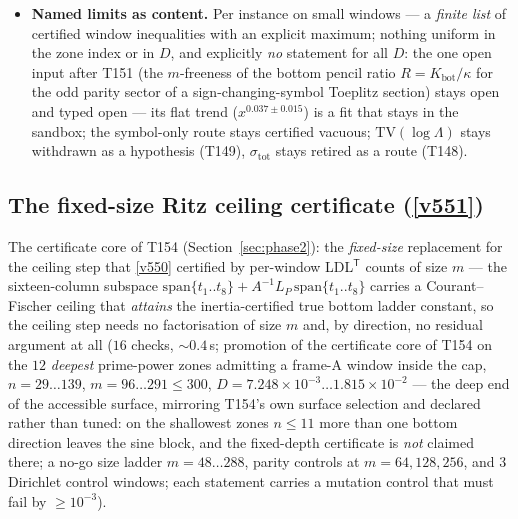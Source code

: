 \documentclass[11pt,a4paper]{article}
\begin{document}
\begin{itemize}[leftmargin=1.5em]
the inflated floor $1.5\kappa$ makes the Cholesky \emph{refuse} on $12/12$.
\item \textbf{Named limits as content.} Per instance on small windows --- a \emph{finite
list} of certified window inequalities with an explicit maximum; nothing uniform in the zone
index or in $D$, and explicitly \emph{no} statement for all $D$: the one open input after
T151 (the $m$-freeness of the bottom pencil ratio $R=K_{\mathrm{bot}}/\kappa$ for the odd
parity sector of a sign-changing-symbol Toeplitz section) stays open and typed open --- its
flat trend ($x^{0.037\pm0.015}$) is a fit that stays in the sandbox; the symbol-only route
stays certified vacuous; $\mathrm{TV}(\log\Lambda)$ stays withdrawn as a hypothesis (T149),
$\sigma_{\mathrm{tot}}$ stays retired as a route (T148).
\end{itemize}

\subsection{The fixed-size Ritz ceiling certificate (\texorpdfstring{\vref{v551}}{v551})}\label{sec:v551}
The certificate core of T154 (Section~\ref{sec:phase2}): the \emph{fixed-size} replacement
for the ceiling step that \vref{v550} certified by per-window LDL$^{\mathsf T}$ counts of
size $m$ --- the sixteen-column subspace
$\mathrm{span}\{t_1..t_8\}+A^{-1}L_P\,\mathrm{span}\{t_1..t_8\}$ carries a Courant--Fischer
ceiling that \emph{attains} the inertia-certified true bottom ladder constant, so the
ceiling step needs no factorisation of size $m$ and, by direction, no residual argument at
all  ($16$ checks, ${\sim}0.4$\,s; promotion of
the certificate core of T154 on the $12$ \emph{deepest} prime-power zones admitting a
frame-A window inside the cap, $n=29\ldots139$, $m=96\ldots291\le300$,
$D=7.248\times10^{-3}\ldots1.815\times10^{-2}$ --- the deep end of the accessible surface,
mirroring T154's own surface selection and declared rather than tuned: on the shallowest
zones $n\le11$ more than one bottom direction leaves the sine block, and the fixed-depth
certificate is \emph{not} claimed there; a no-go size ladder $m=48\ldots288$, parity
controls at $m=64,128,256$, and $3$ Dirichlet control windows; each statement carries a
mutation control that must fail by $\ge10^{-3}$).
\end{document}
